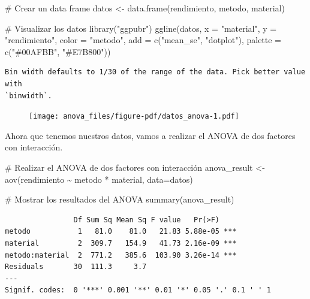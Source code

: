 \documentclass[
  letterpaper,
  DIV=11,
  numbers=noendperiod]{scrreprt}
\newenvironment{Shaded}{\begin{snugshade}}{\end{snugshade}}
\newcommand{\AttributeTok}[1]{\textcolor[rgb]{0.40,0.45,0.13}{#1}}
\newcommand{\CommentTok}[1]{\textcolor[rgb]{0.37,0.37,0.37}{#1}}
\newcommand{\FunctionTok}[1]{\textcolor[rgb]{0.28,0.35,0.67}{#1}}
\newcommand{\NormalTok}[1]{\textcolor[rgb]{0.00,0.23,0.31}{#1}}
\newcommand{\OtherTok}[1]{\textcolor[rgb]{0.00,0.23,0.31}{#1}}
\newcommand{\SpecialCharTok}[1]{\textcolor[rgb]{0.37,0.37,0.37}{#1}}
\newcommand{\StringTok}[1]{\textcolor[rgb]{0.13,0.47,0.30}{#1}}
\begin{document}
\begin{tcolorbox}
\begin{Shaded}
\begin{Highlighting}[]
\CommentTok{\# Crear un data frame}
\NormalTok{datos }\OtherTok{\textless{}{-}} \FunctionTok{data.frame}\NormalTok{(rendimiento, metodo, material)}

\CommentTok{\# Visualizar los datos}
\FunctionTok{library}\NormalTok{(}\StringTok{"ggpubr"}\NormalTok{)}
\FunctionTok{ggline}\NormalTok{(datos, }\AttributeTok{x =} \StringTok{"material"}\NormalTok{, }\AttributeTok{y =} \StringTok{"rendimiento"}\NormalTok{, }\AttributeTok{color =} \StringTok{"metodo"}\NormalTok{,}
       \AttributeTok{add =} \FunctionTok{c}\NormalTok{(}\StringTok{"mean\_se"}\NormalTok{, }\StringTok{"dotplot"}\NormalTok{),}
       \AttributeTok{palette =} \FunctionTok{c}\NormalTok{(}\StringTok{"\#00AFBB"}\NormalTok{, }\StringTok{"\#E7B800"}\NormalTok{))}
\end{Highlighting}
\end{Shaded}

\begin{verbatim}
Bin width defaults to 1/30 of the range of the data. Pick better value with
`binwidth`.
\end{verbatim}

\begin{figure}[H]

{\centering \texttt{[image: anova\_files/figure-pdf/datos\_anova-1.pdf]}

}

\end{figure}

Ahora que tenemos nuestros datos, vamos a realizar el ANOVA de dos
factores con interacción.

\begin{Shaded}
\begin{Highlighting}[]
\CommentTok{\# Realizar el ANOVA de dos factores con interacción}
\NormalTok{anova\_result }\OtherTok{\textless{}{-}} \FunctionTok{aov}\NormalTok{(rendimiento }\SpecialCharTok{\textasciitilde{}}\NormalTok{ metodo }\SpecialCharTok{*}\NormalTok{ material, }\AttributeTok{data=}\NormalTok{datos)}

\CommentTok{\# Mostrar los resultados del ANOVA}
\FunctionTok{summary}\NormalTok{(anova\_result)}
\end{Highlighting}
\end{Shaded}

\begin{verbatim}
                Df Sum Sq Mean Sq F value   Pr(>F)    
metodo           1   81.0    81.0   21.83 5.88e-05 ***
material         2  309.7   154.9   41.73 2.16e-09 ***
metodo:material  2  771.2   385.6  103.90 3.26e-14 ***
Residuals       30  111.3     3.7                     
---
Signif. codes:  0 '***' 0.001 '**' 0.01 '*' 0.05 '.' 0.1 ' ' 1
\end{verbatim}


\end{tcolorbox}
\end{document}
